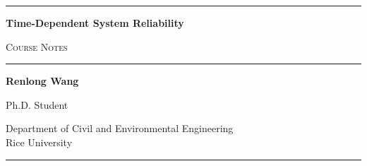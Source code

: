 \documentclass[10pt,a4paper]{book}
\begin{document}
\begin{titlepage}
    \centering
    \thispagestyle{empty}

    \vspace*{1.8cm}

    {\color{blue!45!black}
     \rule{\textwidth}{1.1pt}}

    \vspace{1cm}

    {\fontsize{28pt}{34pt}\selectfont
     \bfseries
     Time-Dependent System Reliability
     \par}

    \vspace{0.7cm}

    {\fontsize{20pt}{25pt}\selectfont
     \color{black!65}
     \textsc{Course Notes}
     \par}

    \vspace{1cm}

    {\color{blue!45!black}
     \rule{\textwidth}{1.1pt}}

    \vfill

    \vspace{-1.0cm}

    {\fontsize{17pt}{21pt}\selectfont
     \bfseries
     Renlong Wang
     \par}

    \vspace{0.45cm}

    {\fontsize{12pt}{15pt}\selectfont
     Ph.D. Student
     \par}

    \vspace{0.3cm}

    {\fontsize{11pt}{14pt}\selectfont
     Department of Civil and Environmental Engineering\\[0.12cm]
     Rice University
     \par}

    \vspace{1.7cm}

    {\color{blue!45!black}
     \rule{\textwidth}{1.1pt}}

    \vspace*{0.8cm}

\end{titlepage}


\setcounter{page}{0}
\thispagestyle{empty}

\tableofcontents
\newpage

%  

 
\end{document}
